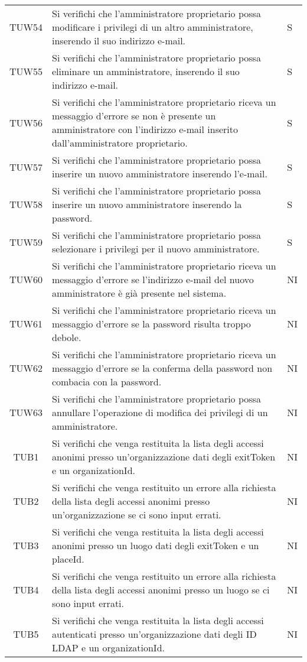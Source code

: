 {\begin{longtable}{ c C{13cm} C{1cm}}
TUW54 & Si verifichi che l’amministratore proprietario possa modificare i privilegi di un altro amministratore, inserendo il suo indirizzo e-mail. & S \\
TUW55 & Si verifichi che l’amministratore proprietario possa eliminare un amministratore, inserendo il suo indirizzo e-mail. & S \\
TUW56 & Si verifichi che l’amministratore proprietario riceva un messaggio d'errore se non è presente un amministratore con l'indirizzo e-mail inserito dall'amministratore proprietario. & S \\
TUW57 & Si verifichi che l’amministratore proprietario possa inserire un nuovo amministratore inserendo l’e-mail. & S \\
TUW58 & Si verifichi che l’amministratore proprietario possa inserire un nuovo amministratore inserendo la password. & S \\
TUW59 & Si verifichi che l’amministratore proprietario possa selezionare i privilegi per il nuovo amministratore. & S \\
TUW60 & Si verifichi che l’amministratore proprietario riceva un messaggio d'errore se l'indirizzo e-mail del nuovo amministratore è già presente nel sistema. & NI \\
TUW61 & Si verifichi che l’amministratore proprietario riceva un messaggio d'errore se la password risulta troppo debole. & NI \\
TUW62 & Si verifichi che l’amministratore proprietario riceva un messaggio d'errore se la conferma della password non combacia con la password. & NI \\
TUW63 & Si verifichi che l’amministratore proprietario possa annullare l'operazione di modifica dei privilegi di un amministratore.  & NI \\
TUB1 & Si verifichi che venga restituita la lista degli accessi anonimi presso un'organizzazione dati degli exitToken e un organizationId. & NI \\
TUB2 & Si verifichi che venga restituito un errore alla richiesta della lista degli accessi anonimi presso un'organizzazione se ci sono input errati. & NI \\
TUB3 & Si verifichi che venga restituita la lista degli accessi anonimi presso un luogo dati degli exitToken e un placeId. & NI \\
TUB4 & Si verifichi che venga restituito un errore alla richiesta della lista degli accessi anonimi presso un luogo se ci sono input errati. & NI \\
TUB5 & Si verifichi che venga restituita la lista degli accessi autenticati presso un'organizzazione dati degli ID LDAP e un organizationId. & NI \\

\end{longtable}}
